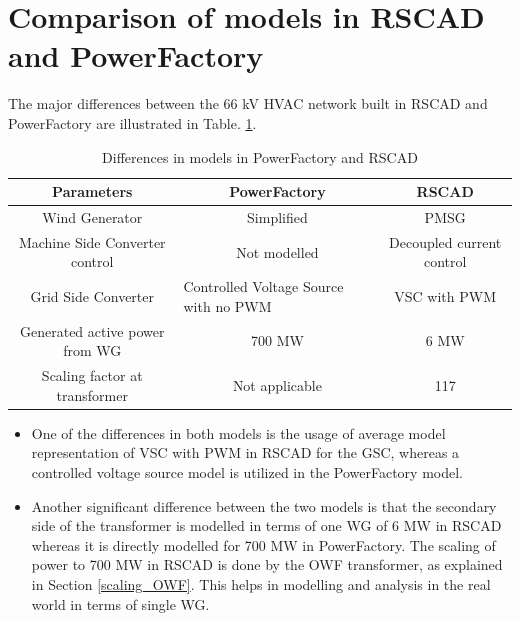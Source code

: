 \section{Comparison of models in RSCAD and PowerFactory }
The major differences between the 66 kV \gls{HVAC} network built in RSCAD and PowerFactory are illustrated in Table. \ref{tab:Comp_RSCAD_PFD_Para}. 
\vspace{-1mm}
\begingroup
\renewcommand{\arraystretch}{1.2} %
\begin{table}[H]
\centering
\begin{tabular}{|c|c|c|}
\hline
\textbf{Parameters}            & \textbf{PowerFactory} & \textbf{RSCAD}            \\ \hline
Wind Generator         & Simplified          & PMSG                      \\ \hline
Machine Side Converter control        & Not modelled          & Decoupled current control \\ \hline
Grid Side Converter & \multicolumn{1}{l|}{Controlled Voltage Source with no PWM} & {VSC with PWM} \\ \hline
Generated active power from WG & 700 MW                & 6 MW                      \\ \hline
Scaling factor at transformer  & Not applicable        & 117                       \\ \hline
\end{tabular}
\caption{Differences in models in PowerFactory and RSCAD}
\label{tab:Comp_RSCAD_PFD_Para}
\end{table}
\endgroup


\begin{itemize}[noitemsep]
    \item One of the differences in both models is the usage of average model representation of \gls{VSC} with \gls{PWM} in RSCAD for the \gls{GSC}, whereas a controlled voltage source model is utilized in the PowerFactory model. 
    \item Another significant difference between the two models is that the secondary side of the transformer is modelled in terms of one \gls{WG} of 6 MW in RSCAD whereas it is directly modelled for 700 MW in PowerFactory. The scaling of power to 700 MW in RSCAD is done by the \gls{OWF} transformer, as explained in Section \ref{scaling_OWF}. This helps in modelling and analysis in the real world in terms of single \gls{WG}.
  \end{itemize}

